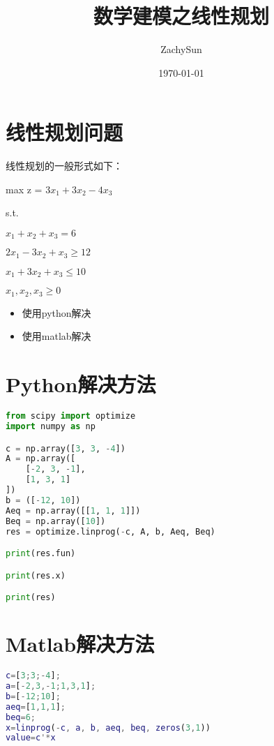 \documentclass[UTF8]{ctexart}
\title{数学建模之线性规划}
\author{ZachySun}
\date{\today}
\begin{document}
\maketitle
\section{线性规划问题}
线性规划的一般形式如下：

max z = 3$x_{1} + 3x_{2} - 4x_{3}$

s.t. 

$x_{1}+x_{2}+x_{3}=6$

$2x_{1}-3x_{2}+x_{3}\ge 12$

$x_{1}+3x_{2}+x_{3}\le 10$

$x_{1},x_{2},x_{3}\ge 0$

\begin{itemize}
\item 使用python解决
\item 使用matlab解决
\end{itemize}

\section{Python解决方法}
\begin{lstlisting}[language=Python]
from scipy import optimize
import numpy as np

c = np.array([3, 3, -4])
A = np.array([
    [-2, 3, -1],
    [1, 3, 1]
])
b = ([-12, 10])
Aeq = np.array([[1, 1, 1]])
Beq = np.array([10]) 
res = optimize.linprog(-c, A, b, Aeq, Beq)

print(res.fun)

print(res.x)

print(res)
\end{lstlisting} 

\section{Matlab解决方法}
\begin{lstlisting}[language=Matlab]
c=[3;3;-4];
a=[-2,3,-1;1,3,1];
b=[-12;10];
aeq=[1,1,1];
beq=6;
x=linprog(-c, a, b, aeq, beq, zeros(3,1))
value=c'*x
\end{lstlisting} 
\end{document}
